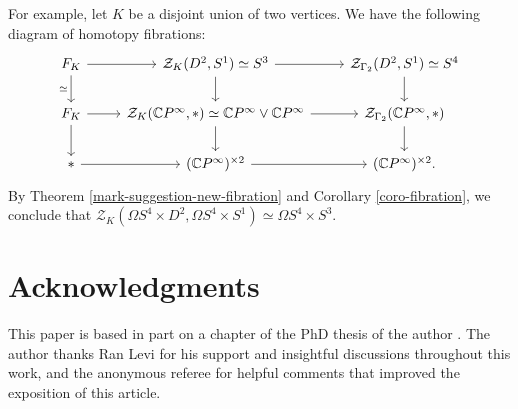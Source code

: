 \documentclass[a4paper,11pt]{article}
\theoremstyle{definition}
\newcommand{\C}{\mathbb{C}}
\newcommand{\ZZ}{\mathcal{Z}}
\begin{document}
For example, let $K$ be a disjoint union of two vertices. We have the following diagram of homotopy fibrations:
		\[
	\begin{tikzcd}
		F_K  \arrow[r] \arrow[d,swap,"\simeq"] & \ZZ_{K}(D^2,S^1) \simeq S^3 \arrow[d] \arrow[r] & \ZZ_{\Gamma_2}(D^2,S^1) \simeq S^4 \arrow[d]\\
		F_K \arrow[d] \arrow[r] &  \ZZ_{K}(\C P^\infty,*) \simeq \C P^\infty \vee \C P^\infty \arrow[d,swap,]\arrow[r] &  \ZZ_{\Gamma_2}(\C P^\infty,*) \arrow[d,]\\ 
		* \arrow[r] & (\C P^\infty)^{\times 2} \arrow[r] & (\C P^\infty)^{\times 2}.
	\end{tikzcd}
	\]
By Theorem \ref{mark-suggestion-new-fibration} and Corollary \ref{coro-fibration}, we conclude that $\ZZ_K(\Omega S^4 \times D^2, \Omega S^4 \times S^1) \simeq \Omega S^4 \times S^3$.

\section*{Acknowledgments} 
 This paper is based in part on a chapter of the PhD thesis of the author \cite{pedro_phd}. The author thanks Ran Levi for his support and insightful discussions throughout this work, and the anonymous referee for helpful comments that improved the exposition of this article.

\printbibliography
\end{document}
